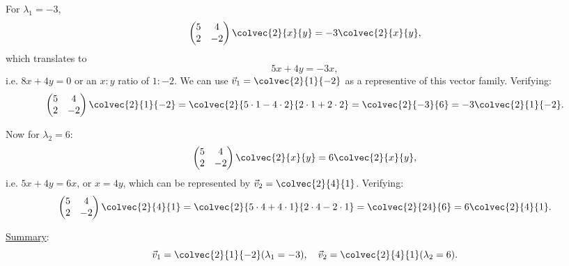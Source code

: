 \begin{enumerate}
{\begin{answer}
			For $\lambda_{1}=-3$,
			\begin{equation*}
				\begin{pmatrix}
					5 & 4 \\
					2 & -2
				\end{pmatrix}\colvec{2}{x}{y} = -3\colvec{2}{x}{y},
			\end{equation*}
			which translates to
			\begin{equation*}
				5x + 4y = -3x,
			\end{equation*}
			i.e. $8x+4y=0$ or an $x:y$ ratio of $1:-2$. We can use $\vec{v}_{1}=\colvec{2}{1}{-2}$ as a representive of this vector family.
			Verifying:
			\begin{equation*}
				\begin{pmatrix}
					5 & 4 \\
					2 & -2
				\end{pmatrix}\colvec{2}{1}{-2} = \colvec{2}{5\cdot1-4\cdot2}{2\cdot1+2\cdot2} = \colvec{2}{-3}{6} = -3\colvec{2}{1}{-2}.
			\end{equation*}

			Now for $\lambda_{2}=6$:
			\begin{equation*}
				\begin{pmatrix}
					5 & 4 \\
					2 & -2
				\end{pmatrix}\colvec{2}{x}{y} = 6\colvec{2}{x}{y},
			\end{equation*}
			i.e. $5x+4y = 6x$, or $x=4y$, which can be represented by $\vec{v}_{2}=\colvec{2}{4}{1}$. Verifying:
			\begin{equation*}
				\begin{pmatrix}
					5 & 4 \\
					2 & -2
				\end{pmatrix}\colvec{2}{4}{1} = \colvec{2}{5\cdot4+4\cdot1}{2\cdot4-2\cdot1} = \colvec{2}{24}{6} = 6\colvec{2}{4}{1}.
			\end{equation*}

			\underline{Summary}:
			\begin{equation*}
				\vec{v}_{1} = \colvec{2}{1}{-2} (\lambda_{1}=-3),\quad \vec{v}_{2} = \colvec{2}{4}{1} (\lambda_{2}=6).
			\end{equation*}
		\end{answer}
	}\fi
\end{enumerate}

